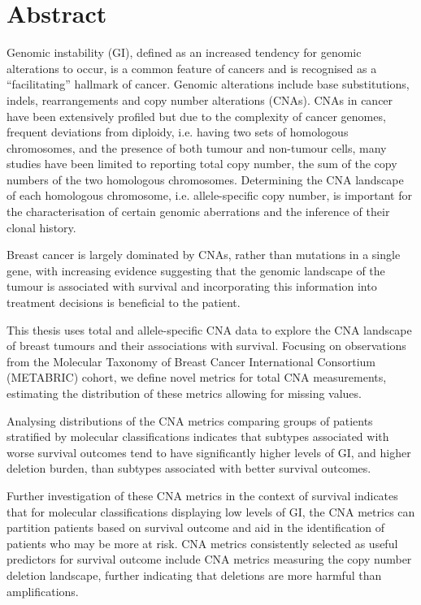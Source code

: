     \vspace{1.5cm}
    
    \section*{\Large{Abstract}}
    \vspace{0.5cm}
    
Genomic instability (GI), defined as an increased tendency for genomic alterations to occur, is a common feature of cancers and is recognised as a “facilitating” hallmark of cancer. Genomic alterations include base substitutions, indels, rearrangements and copy number alterations (CNAs). CNAs in cancer have been extensively profiled but due to the complexity of cancer genomes, frequent deviations from diploidy, i.e. having two sets of homologous chromosomes, and the presence of both tumour and non-tumour cells, many studies have been limited to reporting total copy number, the sum of the copy numbers of the two homologous chromosomes. Determining the CNA landscape of each homologous chromosome, i.e. allele-specific copy number, is important for the characterisation of certain genomic aberrations and the inference of their clonal history.   

Breast cancer is largely dominated by CNAs, rather than mutations in a single gene, with increasing evidence suggesting that the genomic landscape of the tumour is associated with survival and incorporating this information into treatment decisions is beneficial to the patient. 

This thesis uses total and allele-specific CNA data to explore the CNA landscape of breast tumours and their associations with survival. Focusing on observations from the Molecular Taxonomy of Breast Cancer International Consortium (METABRIC) cohort, we define novel metrics for total CNA measurements, estimating the distribution of these metrics allowing for missing values. 

Analysing distributions of the CNA metrics comparing groups of patients stratified by molecular classifications indicates that subtypes associated with worse survival outcomes tend to have significantly higher levels of GI, and higher deletion burden, than subtypes associated with better survival outcomes.   

Further investigation of these CNA metrics in the context of survival indicates that for molecular classifications displaying low levels of GI, the CNA metrics can partition patients based on survival outcome and aid in the identification of patients who may be more at risk. CNA metrics consistently selected as useful predictors for survival outcome include CNA metrics measuring the copy number deletion landscape, further indicating that deletions are more harmful than amplifications. 

